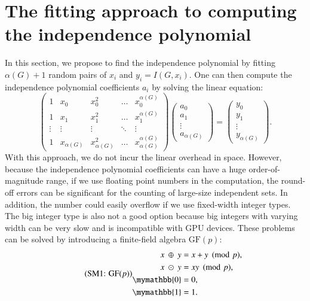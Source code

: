 \documentclass[onefignum, onetabnum]{siamart190516}
\newcommand{\eqname}[1]{\stepcounter{equation}\tag{\theequation : #1}}
\newcommand{\<}{\langle}
\renewcommand{\>}{\rangle}
\begin{document}
\section{The fitting approach to computing the independence polynomial}\label{sec:finitefield}
In this section, we propose to find the independence polynomial by fitting $\alpha(G)+1$ random pairs of $x_{i}$ and $y_{i} = I(G,x_{i})$. One can then compute the independence polynomial coefficients $a_{i}$ by solving the linear equation: 
\begin{equation}
\left(\begin{matrix}
1 & x_0 & x_0^2 & \ldots & x_0^{\alpha(G)} \\
1 & x_1 & x_1^2 & \ldots & x_1^{\alpha(G)} \\
\vdots & \vdots & \vdots &\ddots & \vdots \\
1 & x_{\alpha(G)} & x_{\alpha(G)}^2 & \ldots & x_{\alpha(G)}^{\alpha(G)}
\end{matrix}\right)
\left(\begin{matrix}
a_0 \\ a_1 \\ \vdots \\ a_{\alpha(G)}
\end{matrix}\right)
= \left(\begin{matrix}
y_0 \\ y_1 \\ \vdots \\ y_{\alpha(G)}
\end{matrix}\right).\label{eq:lineareq}
\end{equation}
With this approach, we do not incur the linear overhead in space. However, because the independence polynomial coefficients can have a huge order-of-magnitude range, if we use floating point numbers in the computation, the round-off errors can be significant for the counting of large-size independent sets.
In addition, the number could easily overflow if we use fixed-width integer types.
The big integer type is also not a good option because big integers with varying width can be very slow and is incompatible with GPU devices. These problems can be solved by introducing a finite-field algebra $\text{GF}(p)$:
\begin{equation}
\eqname{GF$(p)$}
\begin{split}
    x ~\oplus~ y &= x+y\pmod p,\\
    x ~\odot~ y &= xy\pmod p,\\
    \mymathbb{0} &= 0,\\
    \mymathbb{1} &= 1.
\end{split}\label{eq:finitefield}
\end{equation}
\end{document}
